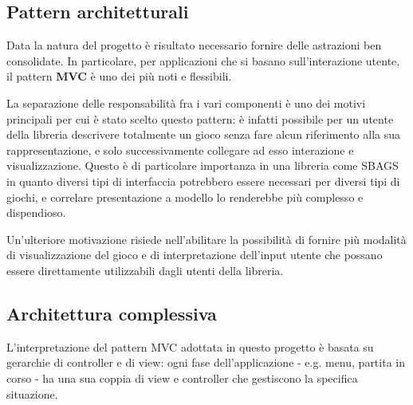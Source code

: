 \subsection{Pattern architetturali}
Data la natura del progetto è risultato necessario fornire delle astrazioni ben consolidate.
%
In particolare, per applicazioni che si basano sull'interazione utente, il pattern \textbf{MVC} è uno dei più noti e flessibili.

La separazione delle responsabilità fra i vari componenti è uno dei motivi principali per cui è stato scelto questo pattern: è infatti possibile per un utente della libreria descrivere totalmente un gioco senza fare alcun riferimento alla sua rappresentazione, e solo successivamente collegare ad esso interazione e visualizzazione.
%
Questo è di particolare importanza in una libreria come SBAGS in quanto diversi tipi di interfaccia potrebbero essere necessari per diversi tipi di giochi, e correlare presentazione a modello lo renderebbe più complesso e dispendioso.

Un'ulteriore motivazione risiede nell'abilitare la possibilità di fornire più modalità di visualizzazione del gioco e di interpretazione dell'input utente che possano essere direttamente utilizzabili dagli utenti della libreria.

\subsection{Architettura complessiva}
L'interpretazione del pattern MVC adottata in questo progetto è basata su gerarchie di controller e di view: ogni fase dell'applicazione - e.g. menu, partita in corso - ha una sua coppia di view e controller che gestiscono la specifica situazione.

